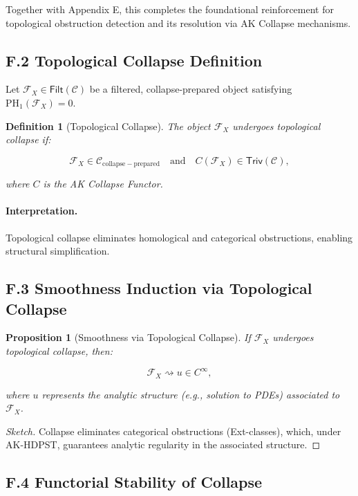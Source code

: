 \documentclass[11pt]{article}
\newtheorem{definition}[theorem]{Definition}
\newtheorem{proposition}[theorem]{Proposition}
\begin{document}
Together with Appendix E, this completes the foundational reinforcement for topological obstruction detection and its resolution via AK Collapse mechanisms.

\subsection*{F.2 Topological Collapse Definition}

Let \( \mathcal{F}_X \in \mathsf{Filt}(\mathcal{C}) \) be a filtered, collapse-prepared object satisfying \( \mathrm{PH}_1(\mathcal{F}_X) = 0 \).

\begin{definition}[Topological Collapse]
The object \( \mathcal{F}_X \) undergoes \emph{topological collapse} if:

\[
\mathcal{F}_X \in \mathcal{C}_{\mathrm{collapse-prepared}} \quad \text{and} \quad C(\mathcal{F}_X) \in \mathsf{Triv}(\mathcal{C}),
\]

where \( C \) is the AK Collapse Functor.
\end{definition}

\paragraph{Interpretation.}
Topological collapse eliminates homological and categorical obstructions, enabling structural simplification.

\subsection*{F.3 Smoothness Induction via Topological Collapse}

\begin{proposition}[Smoothness via Topological Collapse]
If \( \mathcal{F}_X \) undergoes topological collapse, then:

\[
\mathcal{F}_X \rightsquigarrow u \in C^\infty,
\]

where \( u \) represents the analytic structure (e.g., solution to PDEs) associated to \( \mathcal{F}_X \).
\end{proposition}

\begin{proof}[Sketch]
Collapse eliminates categorical obstructions (Ext-classes), which, under AK-HDPST, guarantees analytic regularity in the associated structure.
\end{proof}

\subsection*{F.4 Functorial Stability of Collapse}
\end{document}
